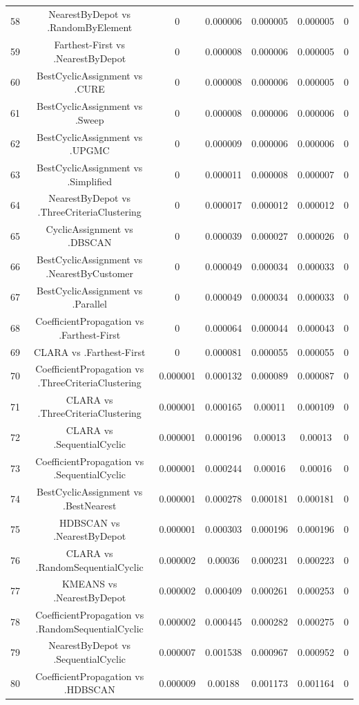 \documentclass[a4paper,10pt]{article}
\begin{document}
\begin{landscape}
\begin{table}[!htp]
\begin{tabular}{ccccccc}
58&NearestByDepot vs .RandomByElement&0&0.000006&0.000005&0.000005&0\\
59&Farthest-First vs .NearestByDepot&0&0.000008&0.000006&0.000005&0\\
60&BestCyclicAssignment vs .CURE&0&0.000008&0.000006&0.000005&0\\
61&BestCyclicAssignment vs .Sweep&0&0.000008&0.000006&0.000006&0\\
62&BestCyclicAssignment vs .UPGMC&0&0.000009&0.000006&0.000006&0\\
63&BestCyclicAssignment vs .Simplified&0&0.000011&0.000008&0.000007&0\\
64&NearestByDepot vs .ThreeCriteriaClustering&0&0.000017&0.000012&0.000012&0\\
65&CyclicAssignment vs .DBSCAN&0&0.000039&0.000027&0.000026&0\\
66&BestCyclicAssignment vs .NearestByCustomer&0&0.000049&0.000034&0.000033&0\\
67&BestCyclicAssignment vs .Parallel&0&0.000049&0.000034&0.000033&0\\
68&CoefficientPropagation vs .Farthest-First&0&0.000064&0.000044&0.000043&0\\
69&CLARA vs .Farthest-First&0&0.000081&0.000055&0.000055&0\\
70&CoefficientPropagation vs .ThreeCriteriaClustering&0.000001&0.000132&0.000089&0.000087&0\\
71&CLARA vs .ThreeCriteriaClustering&0.000001&0.000165&0.00011&0.000109&0\\
72&CLARA vs .SequentialCyclic&0.000001&0.000196&0.00013&0.00013&0\\
73&CoefficientPropagation vs .SequentialCyclic&0.000001&0.000244&0.00016&0.00016&0\\
74&BestCyclicAssignment vs .BestNearest&0.000001&0.000278&0.000181&0.000181&0\\
75&HDBSCAN vs .NearestByDepot&0.000001&0.000303&0.000196&0.000196&0\\
76&CLARA vs .RandomSequentialCyclic&0.000002&0.00036&0.000231&0.000223&0\\
77&KMEANS vs .NearestByDepot&0.000002&0.000409&0.000261&0.000253&0\\
78&CoefficientPropagation vs .RandomSequentialCyclic&0.000002&0.000445&0.000282&0.000275&0\\
79&NearestByDepot vs .SequentialCyclic&0.000007&0.001538&0.000967&0.000952&0\\
80&CoefficientPropagation vs .HDBSCAN&0.000009&0.00188&0.001173&0.001164&0\\

\end{tabular}
\end{table}
\end{landscape}
\end{document}
